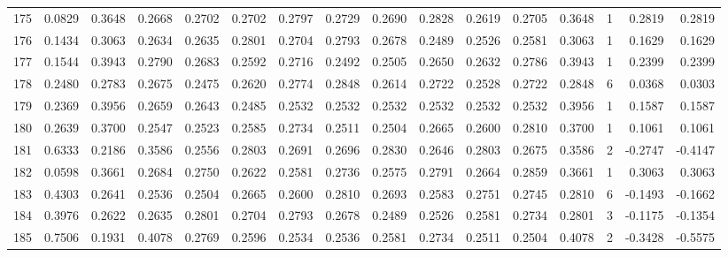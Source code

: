 \begin{tabular}{lrrrrrrrrrrrrrrr}
175 &      0.0829 &  0.3648 &  0.2668 &  0.2702 &  0.2702 &  0.2797 &  0.2729 &  0.2690 &  0.2828 &  0.2619 &   0.2705 &     0.3648 &      1 &                    0.2819 &                     0.2819 \\
176 &      0.1434 &  0.3063 &  0.2634 &  0.2635 &  0.2801 &  0.2704 &  0.2793 &  0.2678 &  0.2489 &  0.2526 &   0.2581 &     0.3063 &      1 &                    0.1629 &                     0.1629 \\
177 &      0.1544 &  0.3943 &  0.2790 &  0.2683 &  0.2592 &  0.2716 &  0.2492 &  0.2505 &  0.2650 &  0.2632 &   0.2786 &     0.3943 &      1 &                    0.2399 &                     0.2399 \\
178 &      0.2480 &  0.2783 &  0.2675 &  0.2475 &  0.2620 &  0.2774 &  0.2848 &  0.2614 &  0.2722 &  0.2528 &   0.2722 &     0.2848 &      6 &                    0.0368 &                     0.0303 \\
179 &      0.2369 &  0.3956 &  0.2659 &  0.2643 &  0.2485 &  0.2532 &  0.2532 &  0.2532 &  0.2532 &  0.2532 &   0.2532 &     0.3956 &      1 &                    0.1587 &                     0.1587 \\
180 &      0.2639 &  0.3700 &  0.2547 &  0.2523 &  0.2585 &  0.2734 &  0.2511 &  0.2504 &  0.2665 &  0.2600 &   0.2810 &     0.3700 &      1 &                    0.1061 &                     0.1061 \\
181 &      0.6333 &  0.2186 &  0.3586 &  0.2556 &  0.2803 &  0.2691 &  0.2696 &  0.2830 &  0.2646 &  0.2803 &   0.2675 &     0.3586 &      2 &                   -0.2747 &                    -0.4147 \\
182 &      0.0598 &  0.3661 &  0.2684 &  0.2750 &  0.2622 &  0.2581 &  0.2736 &  0.2575 &  0.2791 &  0.2664 &   0.2859 &     0.3661 &      1 &                    0.3063 &                     0.3063 \\
183 &      0.4303 &  0.2641 &  0.2536 &  0.2504 &  0.2665 &  0.2600 &  0.2810 &  0.2693 &  0.2583 &  0.2751 &   0.2745 &     0.2810 &      6 &                   -0.1493 &                    -0.1662 \\
184 &      0.3976 &  0.2622 &  0.2635 &  0.2801 &  0.2704 &  0.2793 &  0.2678 &  0.2489 &  0.2526 &  0.2581 &   0.2734 &     0.2801 &      3 &                   -0.1175 &                    -0.1354 \\
185 &      0.7506 &  0.1931 &  0.4078 &  0.2769 &  0.2596 &  0.2534 &  0.2536 &  0.2581 &  0.2734 &  0.2511 &   0.2504 &     0.4078 &      2 &                   -0.3428 &                    -0.5575 \\

\end{tabular}
